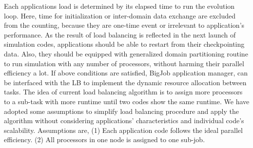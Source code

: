 \documentclass[conference,final]{IEEEtran}
\begin{document}

Each applications load is determined by its elapsed time to run the evolution loop. Here, time for initialization or inter-domain data exchange are excluded from the counting, because they are one-time event or irrelevant to application's performance. As the result of load balancing is reflected in the next launch of simulation codes, applications should be able to restart from their checkpointing data. Also, they should be equipped with generalized domain partitioning routine to run simulation with any number of processors, without harming their parallel efficiency a lot.  If above conditions are satisfied, BigJob application manager,
can be interfaced with the LB to implement the dynamic resource allocation between tasks.
The idea of current load balancing algorithm is to assign more processors to a sub-task with more runtime until two codes show the same runtime. We have adopted some assumptions to simplify load balancing procedure and apply the algorithm without considering applications' characteristics and individual code's scalability. Assumptions are, (1) Each application code follows the ideal parallel efficiency.
(2) All processors in one node is assigned to one sub-job.



\end{document}
